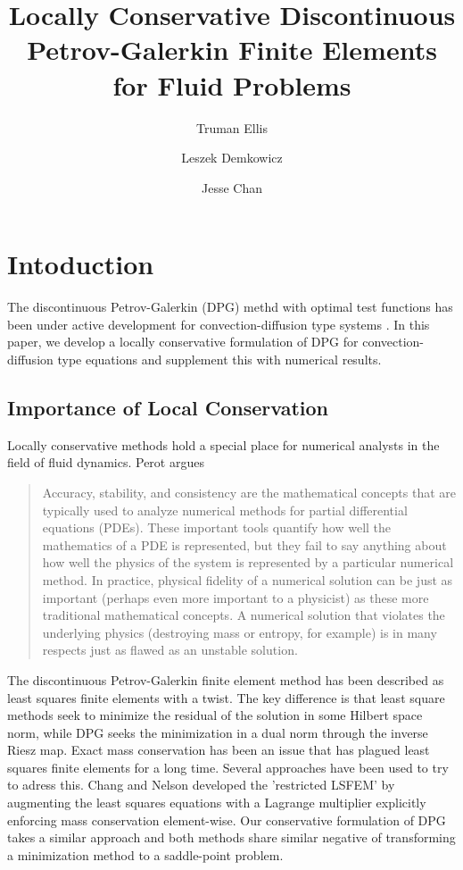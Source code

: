 \documentclass[letterpaper]{article}
\title{Locally Conservative Discontinuous Petrov-Galerkin Finite Elements for
Fluid Problems}
\author{Truman Ellis}
\author{Leszek Demkowicz}
\author{Jesse Chan}
\affil{Institute for Computational Engineering and Sciences,\\
The University of Texas at Austin, \\
Austin, TX 78712}
\date{}
\begin{document}
\maketitle

\begin{abstract}
\end{abstract}

\section{Intoduction}
The discontinuous Petrov-Galerkin (DPG) methd with optimal test functions has
been under active development for convection-diffusion type systems
\cite{DPG1, DPG2, DPG3, DPG5, DemkowiczHeuer, ChanHeuerThanhDemkowicz2012,
MoroNguyenPeraire11}. In this paper, we develop a locally conservative
formulation of DPG for convection-diffusion type equations and supplement this
with numerical results. 

\subsection{Importance of Local Conservation}
Locally conservative methods hold a special place for numerical analysts in
the field of fluid dynamics. 
Perot\cite{Perot2011} argues
\begin{quote}
Accuracy, stability, and consistency are the mathematical concepts that are
typically used to analyze numerical methods for partial differential equations
(PDEs). These important tools quantify how well the mathematics of a PDE is
represented, but they fail to say anything about how well the physics of the
system is represented by a particular numerical method. In practice, physical
fidelity of a numerical solution can be just as important (perhaps even more
important to a physicist) as these more traditional mathematical concepts. A
numerical solution that violates the underlying physics (destroying mass or
entropy, for example) is in many respects just as flawed as an unstable
solution.
\end{quote}

The discontinuous Petrov-Galerkin finite element method has been described as
least squares finite elements with a twist. The key difference is that least
square methods seek to minimize the residual of the solution in some Hilbert
space norm, while DPG seeks the minimization in a dual norm through the
inverse Riesz map. Exact mass conservation has been an issue that has plagued
least squares finite elements for a long time. Several approaches have been
used to try to adress this. Chang and Nelson\cite{ChangNelson1997} developed
the 'restricted LSFEM'\cite{ChangNelson1997} by augmenting the least squares
equations with a Lagrange multiplier explicitly enforcing mass conservation
element-wise. Our conservative formulation of DPG takes a similar approach and
both methods share similar negative of transforming a minimization method to a
saddle-point problem.
\end{document}
